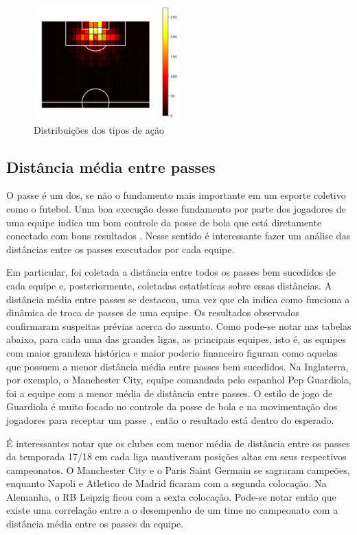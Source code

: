 \documentclass{article}
\begin{document}
\begin{figure}[H]
	\centering
	\includegraphics[width=0.5\textwidth]{images/goal_position_heatmap.png}
	\caption{Distribuições dos tipos de ação}
	\label{fig:heatmap_goals}
\end{figure}

\subsection{Distância média entre passes}

O passe é um dos, se não o fundamento mais importante em um esporte coletivo
como o futebol. Uma boa execução desse fundamento por parte dos jogadores
de uma equipe indica um bom controle da posse de bola que está diretamente
conectado com bons resultados \cite{cox2022linhas}. Nesse sentido é
interessante fazer um análise
das distâncias entre os passes
executados por cada equipe.

Em particular, foi coletada a distância entre todos os passes bem sucedidos de
cada equipe e, posteriormente, coletadas estatísticas sobre essas distâncias. A
distância média
entre passes se destacou, uma vez que ela indica como funciona a dinâmica de
troca de passes de uma equipe. Os resultados observados confirmaram suspeitas
prévias acerca do assunto.
Como pode-se notar nas tabelas abaixo, para cada uma das grandes ligas, as
principais equipes, isto é, as equipes com maior grandeza histórica e maior
poderio financeiro figuram como aquelas
que possuem a menor distância média entre passes bem sucedidos. Na Inglaterra,
por exemplo, o Manchester City, equipe comandada pelo espanhol Pep Guardiola,
foi a equipe com a menor média
de distância entre passes. O estilo de jogo de Guardiola é muito focado no
controle da posse de bola e na movimentação dos jogadores para receptar um
passe \cite{terzis2023pep}, então o resultado está dentro do
esperado.

É interessantes notar que os clubes com menor média de distância entre os
passes da temporada 17/18 em cada liga mantiveram posições altas em seus
respectivos campeonatos. O Manchester City e o Paris Saint Germain se sagraram
campeões, enquanto Napoli e Atletico de Madrid ficaram com a segunda colocação.
Na Alemanha, o RB Leipzig ficou com a sexta colocação. Pode-se notar então que
existe uma correlação entre a o desempenho de um time no campeonato com a
distância média entre os passes da equipe.
\end{document}

